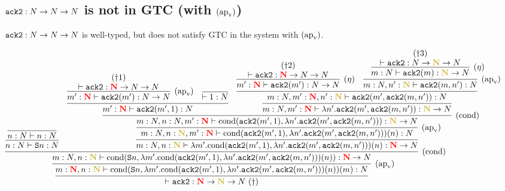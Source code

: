 \documentclass{article}
\newcommand{\bfColor}[2]{{\bf \color{#1}{#2}}}
\newcommand{\Rapv}{\hbox{$(\text{ap}_{\text{v}})$}}
\newcommand{\Reta}{\hbox{$(\eta)$}}
\newcommand{\Rcond}{\hbox{$(\text{cond})$}}
\newcommand{\AckB}{{\tt ack2}}
\newcommand{\Cond}[2]{\text{cond}(#1,#2)}
\newcommand{\Suc}[1]{{\tt S}#1}
\newcommand{\N}{N}
\newcommand{\gN}{\bfColor{oldgold}{N}}
\newcommand{\rN}{\bfColor{red}{N}}
\newenvironment{claim}[1][Claim]{\begin{trivlist}
\item[\hskip \labelsep {\bfseries #1}]}{\end{trivlist}}
\begin{document}
\subsection{$\AckB:\N\to\N\to\N$ is not in GTC (with $\Rapv$)}

\begin{claim}
  $\AckB:\N\to\N\to\N$ is well-typed, but does not satisfy GTC in the system with $\Rapv$.
\end{claim}

{\scriptsize
  \hspace{-3cm}
  $\infer{
    \vdash \AckB:\rN\to\gN\to\N\ (\dagger)
  }{
    \infer[\Rapv]{
      m:\rN, n:\gN \vdash \Cond{\Suc{n}}{\lambda m'.\Cond{\AckB(m',1)}{\lambda n'.\AckB(m',\AckB(m,n'))}(n)}(m): \N
    }{
      \infer[\Rcond]{
        m:\N, n:\gN \vdash \Cond{\Suc{n}}{\lambda m'.\Cond{\AckB(m',1)}{\lambda n'.\AckB(m',\AckB(m,n'))}(n)}: \rN\to\N
      }{
        \infer{
          n:\N \vdash \Suc{n}: \N
        }{
          \infer{
            n:\N \vdash n: \N
          }{}
        }
        &
        \infer{
          m:\N, n:\gN \vdash \lambda m'.\Cond{\AckB(m',1)}{\lambda n'.\AckB(m',\AckB(m,n'))}(n): \rN\to\N
        }{
          \infer[\Rapv]{
            m:\N, n:\gN, m':\rN \vdash \Cond{\AckB(m',1)}{\lambda n'.\AckB(m',\AckB(m,n'))}(n): \N
          }{
            \infer[\Rcond]{
              m:\N, n:\N, m':\rN \vdash \Cond{\AckB(m',1)}{\lambda n'.\AckB(m',\AckB(m,n'))}: \gN\to\N
            }{
              \infer{
                m':\rN \vdash \AckB(m',1): \N
              }{
                \infer[\Rapv]{
                  m':\rN \vdash \AckB(m'): \N\to\N
                }{
                  \deduce{
                    \vdash \AckB: \rN\to\N\to\N
                  }{(\dagger1)}
                }
                &
                \infer{
                  \vdash 1:\N
                }{}
              }
              &
              \infer{
                m:\N, m':\rN \vdash \lambda n'.\AckB(m',\AckB(m,n')): \gN\to\N
              }{
                \infer{
                  m:\N, m':\rN, n':\gN \vdash \AckB(m',\AckB(m,n')): \N
                }{
                  \infer[\Reta]{
                    m':\rN \vdash \AckB(m'): \N\to\N
                  }{
                    \deduce{
                      \vdash \AckB: \rN\to\N\to\N
                    }{(\dagger2)}
                  }
                  &
                  \infer[\Rapv]{
                    m:\N, n':\gN \vdash \AckB(m,n'): \N
                  }{
                    \infer[\Reta]{
                      m:\N \vdash \AckB(m): \gN\to\N
                    }{
                      \deduce{
                        \vdash \AckB: \N\to\gN\to\N
                      }{(\dagger3)}
                    }
                  }
                }
              }
            }
          }
        }
      }
    }
  }$
}
\end{document}
